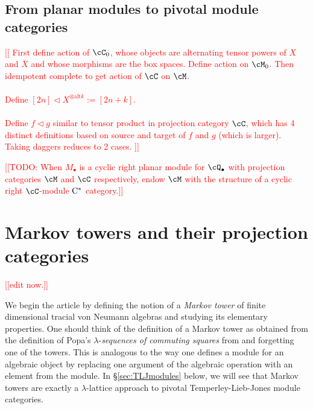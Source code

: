 \documentclass[11pt]{article}
\theoremstyle{plain}
\theoremstyle{definition}
\newcommand{\Cstar}{\rm{C^*}}
\newcommand{\nn}[1]{\textcolor{red}{[[#1]]}}
\begin{document}
\subsection{From planar modules to pivotal module categories}

\nn{
First define action of $\cC_0$, whose objects are alternating tensor powers of $X$ and $\overline{X}$ and whose morphisms are the box spaces.
Define action on $\cM_0$.
Then idempotent complete to get action of $\cC$ on $\cM$.
\\
\\
Define $[2n] \vartriangleleft X^{\otimes \text{alt}k} := [2n+k]$.
\\
\\
Define $f \vartriangleleft g$ similar to tensor product in projection category $\cC$, which has 4 distinct definitions based on source and target of $f$ and $g$ (which is larger).
Taking daggers reduces to 2 cases.
}





\nn{TODO: When $M_\bullet$ is a cyclic right planar module for $\cQ_\bullet$ with projection categories $\cM$ and $\cC$ respectively, endow $\cM$ with the structure of a cyclic right $\cC$-module $\Cstar$ category.}


\section{Markov towers and their projection categories} 
\label{sec:MarkovTowers}

\nn{edit now.}

We begin the article by defining the notion of a \emph{Markov tower} of finite dimensional tracial von Neumann algebras and studying its elementary properties.
One should think of the definition of a Markov tower as obtained from the definition of Popa's $\lambda$-\emph{sequences of commuting squares} from \cite{MR1334479} and forgetting one of the towers.
This is analogous to the way one defines a module for an algebraic object by replacing one argument of the algebraic operation with an element from the module.
In \S\ref{sec:TLJmodules} below, we will see that Markov towers are exactly a $\lambda$-lattice approach to pivotal Temperley-Lieb-Jones module categories.
\end{document}
